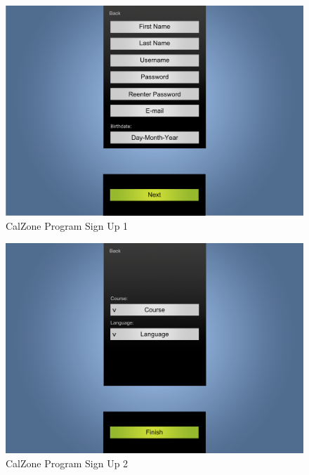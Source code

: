 \begin{center}
\begin{figure}[H]
\caption{CalZone Program Sign Up 1}
\centerline{\includegraphics[scale=0.4]{img/Calzonesignup}}
\label{fig:CalZone Program Sign Up}
\end{figure}

\begin{figure}[H]
\caption{CalZone Program Sign Up 2}
\centerline{\includegraphics[scale=0.4]{img/Calzonesignup2}}
\label{fig:CalZone Program Sign Up 2}
\end{figure}

\end{center}
\clearpage
